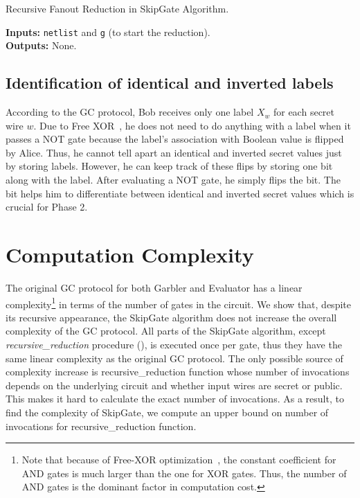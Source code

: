 \begin{algorithm}[ht]
\caption{Recursive Fanout Reduction in SkipGate Algorithm.}
\textbf{Inputs:} \texttt{netlist} and \texttt{g} (to start the reduction).\\
\textbf{Outputs:} None.\\
\label{skipgate_reduction}
\begin{algorithmic}[1]

\ENDIF
{}
	\ENDIF
	\ENDIF
\ENDIF
\end{algorithmic}
\end{algorithm}

\subsection{Identification of identical and inverted labels} According to the GC protocol, Bob receives only one label $X_w$ for each secret wire $w$.
Due to Free XOR~\cite{kolesnikov2008improved}, he does not need to do anything with a label when it passes a NOT gate because the label's association with Boolean value is flipped by Alice.
Thus, he cannot tell apart an identical and inverted secret values just by storing labels.
However, he can keep track of these flips by storing one bit along with the label.
After evaluating a NOT gate, he simply flips the bit.
The bit helps him to differentiate between identical and inverted secret values which is crucial for Phase 2.

\section{Computation Complexity}\label{ssec:skipgate_complexity}
The original GC protocol for both Garbler and Evaluator has a linear complexity\footnote{Note that because of Free-XOR optimization~\cite{kolesnikov2008improved}, the constant coefficient for AND gates is much larger than the one for XOR gates.
Thus, the number of AND gates is the dominant factor in computation cost.} in terms of the number of gates in the circuit.
We show that, despite its recursive appearance, the SkipGate algorithm does not increase the overall complexity of the GC protocol.
All parts of the SkipGate algorithm, except \textit{recursive\_reduction} procedure (), is executed once per gate, thus they have the same linear complexity as the original GC protocol.
The only possible source of complexity increase is recursive\_reduction function whose number of invocations depends on the underlying circuit and whether input wires are secret or public.
This makes it hard to calculate the exact number of invocations.
As a result, to find the complexity of SkipGate, we compute an upper bound on number of invocations for recursive\_reduction function.

